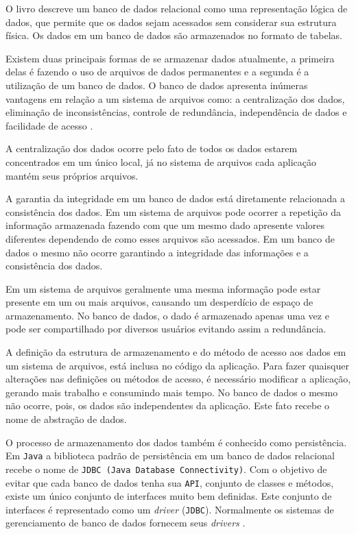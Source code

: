 O livro \cite[p.~900]{deitel2009java} descreve um banco de dados relacional como uma representação lógica de dados, que permite que os dados sejam acessados sem considerar sua estrutura física. Os dados em um banco de dados são armazenados no formato de tabelas.

 Existem duas principais formas de se armazenar dados atualmente, a primeira delas é fazendo o uso de arquivos de dados permanentes e a 
 segunda é a utilização de um banco de dados. O banco de dados apresenta inúmeras vantagens em relação a um sistema de arquivos como: a 
 centralização dos dados, eliminação de inconsistências, controle de redundância, independência de dados e facilidade de acesso \cite{bdrelacional}. 
 
 A centralização dos dados ocorre pelo fato de todos os dados estarem concentrados em um único local, já no sistema de arquivos cada 
 aplicação mantém seus próprios arquivos. 

 A garantia da integridade em um banco de dados está diretamente relacionada a consistência dos dados. Em um sistema de arquivos pode 
 ocorrer a repetição da informação armazenada fazendo com que um mesmo dado apresente valores diferentes dependendo de como esses arquivos
 são acessados. Em um banco de dados o mesmo não ocorre garantindo a integridade das informações e a consistência dos dados.
 
 Em um sistema de arquivos geralmente uma mesma informação pode estar presente em um ou mais arquivos, causando um desperdício de espaço 
 de armazenamento. No banco de dados, o dado é armazenado apenas uma vez e pode ser compartilhado por diversos usuários evitando assim a 
 redundância.
 
 A definição da estrutura de armazenamento e do método de acesso aos dados em um sistema de arquivos, está inclusa no código da aplicação.
 Para fazer quaisquer alterações nas definições ou métodos de acesso, é necessário modificar a aplicação, gerando mais trabalho e consumindo
 mais tempo. No banco de dados o mesmo não ocorre, pois, os dados são independentes da aplicação. Este fato recebe o nome de abstração de 
 dados.

 O processo de armazenamento dos dados também é conhecido como persistência. Em \texttt{Java} a biblioteca padrão de persistência em um banco de dados
 relacional recebe o nome de \texttt{JDBC (Java Database Connectivity)}. Com o objetivo de evitar que cada banco de dados tenha sua \texttt{API}, conjunto 
 de classes e métodos, existe um único conjunto de interfaces muito bem definidas. Este conjunto de interfaces é representado como um \textit{driver}
 (\texttt{JDBC}). Normalmente os sistemas de gerenciamento de banco de dados fornecem seus \textit{drivers} \cite{caelumweb}.
 

